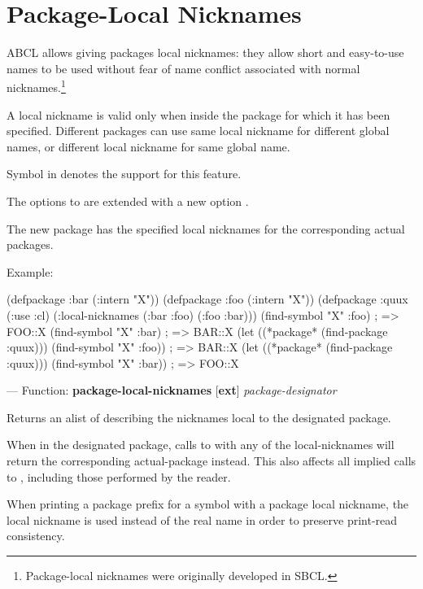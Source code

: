 \documentclass[10pt]{book}
\begin{document}
\section{Package-Local Nicknames}
\label{sec:pack-local-nickn}

ABCL allows giving packages local nicknames: they allow short and
easy-to-use names to be used without fear of name conflict associated
with normal nicknames.\footnote{Package-local nicknames were originally
developed in SBCL.}

A local nickname is valid only when inside the package for which it
has been specified. Different packages can use same local nickname for
different global names, or different local nickname for same global
name.

Symbol  in  denotes the
support for this feature.

The options to  are extended with a new option
.

The new package has the specified local nicknames for the corresponding
actual packages.

Example:
\begin{listing-lisp}
(defpackage :bar (:intern "X"))
(defpackage :foo (:intern "X"))
(defpackage :quux (:use :cl)
  (:local-nicknames (:bar :foo) (:foo :bar)))
(find-symbol "X" :foo) ; => FOO::X
(find-symbol "X" :bar) ; => BAR::X
(let ((*package* (find-package :quux)))
  (find-symbol "X" :foo))               ; => BAR::X
(let ((*package* (find-package :quux)))
  (find-symbol "X" :bar))               ; => FOO::X
\end{listing-lisp}

--- Function: \textbf{package-local-nicknames} [\textbf{ext}] \textit{package-designator}

\begin{adjustwidth}{5em}{5em}
  Returns an alist of 
  describing the nicknames local to the designated package.

  When in the designated package, calls to  with any
  of the local-nicknames will return the corresponding actual-package
  instead. This also affects all implied calls to ,
  including those performed by the reader.

  When printing a package prefix for a symbol with a package local
  nickname, the local nickname is used instead of the real name in order
  to preserve print-read consistency.
\end{adjustwidth}
\end{document}
